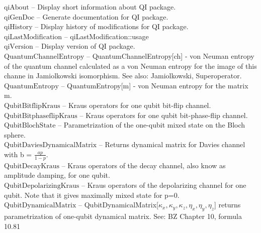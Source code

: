 \documentclass[a4paper,11pt]{article}
\begin{document}
\textbf{$ \text{qiAbout} $ }-- Display short information about QI package.$  $\\

\textbf{$ \text{qiGenDoc} $ }-- Generate documentation for QI package.$  $\\

\textbf{$ \text{qiHistory} $ }-- Display history of modifications for QI package.$  $\\

\textbf{$ \text{qiLastModification} $ }-- qiLastModification$ \text{::} $usage$  $\\

\textbf{$ \text{qiVersion} $ }-- Display version of QI package.$  $\\

\textbf{$ \text{QuantumChannelEntropy} $ }-- QuantumChannelEntropy[ch] - von Neuman entropy of the quantum channel calculated as a von Neuman entropy for the image of this channe in Jamiolkowski isomorphism. See also: Jamiolkowski, Superoperator.$  $\\

\textbf{$ \text{QuantumEntropy} $ }-- QuantumEntropy[m] - von Neuman entropy for the matrix m.$  $\\

\textbf{$ \text{QubitBitflipKraus} $ }-- Kraus operators for one qubit bit-flip channel.$  $\\

\textbf{$ \text{QubitBitphaseflipKraus} $ }-- Kraus operators for one qubit bit-phase-flip channel.$  $\\

\textbf{$ \text{QubitBlochState} $ }-- Parametrization of the one-qubit mixed state on the Bloch sphere.$  $\\

\textbf{$ \text{QubitDaviesDynamicalMatrix} $ }-- Returns dynamical matrix for Davies channel with b = $ \frac{a p}{1-p}. $\\

\textbf{$ \text{QubitDecayKraus} $ }-- Kraus operators of the decay channel, also know as amplitude damping, for one qubit.$  $\\

\textbf{$ \text{QubitDepolarizingKraus} $ }-- Kraus operators of the depolarizing channel for one qubit. Note that it gives maximally mixed state for p=0.$  $\\

\textbf{$ \text{QubitDynamicalMatrix} $ }-- QubitDynamicalMatrix[$ \kappa _x,\kappa _y,\kappa _z,\eta _x,\eta _y,\eta _z $] returns parametrization of one-qubit dynamical matrix. See: BZ Chapter 10, formula 10.81$  $\\
\end{document}
